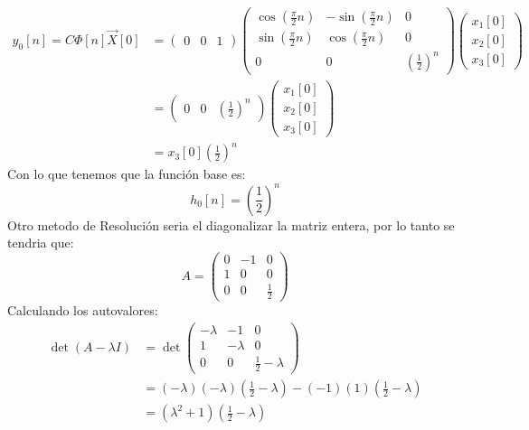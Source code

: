 \documentclass[
  11pt,
  letterpaper,
   addpoints,
   answers
  ]{exam}
\begin{document}
\begin{questions}
\begin{solution}
\begin{align}
  y_{0}[n] = C \Phi[n] \vec{X}[0] &= \begin{pmatrix} 0 & 0 & 1 \end{pmatrix} \begin{pmatrix} \cos\left(\frac{\pi}{2} n\right
) & -\sin\left(\frac{\pi}{2} n\right) & 0 \\ \sin\left(\frac{\pi}{2} n\right) & \cos\left(\frac{\pi}{2} n\right) & 0 \\ 0 & 0 & \left(\frac{1}{2}\right)^n \end{pmatrix} \begin{pmatrix} x_1[0] \\ x_2[0] \\ x_3[0] \end{pmatrix}\\
    &= \begin{pmatrix} 0 & 0 & \left(\frac{1}{2}\right)^n \end{pmatrix} \begin{pmatrix} x_1[0] \\ x_2[0] \\ x_3[0] \end{pmatrix}\\
     &= x_3[0] \left(\frac{1}{2}\right)^n
\end{align}
Con lo que tenemos que la función base es:
\begin{equation}
  h_0[n] = \left(\frac{1}{2}\right)^n
\end{equation}
Otro metodo de Resolución seria el diagonalizar la matriz entera, por lo tanto se tendria que:
\begin{equation}
  A = \begin{pmatrix} 0 & -1 & 0 \\ 1 & 0 & 0 \\ 0 & 0 & \frac{1}{2} \end{pmatrix}
\end{equation}
Calculando los autovalores:
\begin{align}
  \det(A - \lambda I) &= \det\begin{pmatrix} -\lambda & -1 & 0 \\ 1 & -\lambda & 0 \\ 0 & 0 & \frac{1}{2} - \lambda \end{pmatrix}\\
  &= (-\lambda)(-\lambda)(\frac{1}{2} - \lambda) - (-1)(1)(\frac{1}{2} - \lambda)\\
  &= (\lambda^2 + 1)(\frac{1}{2} - \lambda)
\end{align}

\end{solution}
\end{questions}
\end{document}
